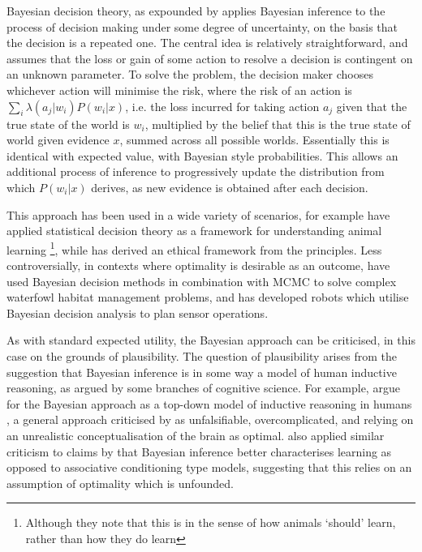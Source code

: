 Bayesian decision theory, as expounded by \citet{Robbins1964} applies
Bayesian inference to the process of decision making under some degree
of uncertainty, on the basis that the decision is a repeated one.
The central idea is relatively straightforward, and assumes that the
loss or gain of some action to resolve a decision is contingent on
an unknown parameter. To solve the problem, the decision maker chooses
whichever action will minimise the risk, where the risk of an action
is $\underset{i}{\sum}\lambda(a_{j}|w_{i})P(w_{i}|x)$, i.e. the loss
incurred for taking action $a_{j}$ given that the true state of the
world is $w_{i}$, multiplied by the belief that this is the true
state of world given evidence $x$, summed across all possible worlds.
Essentially this is identical with expected value, with Bayesian style
probabilities. This allows an additional process of inference to progressively
update the distribution from which $P(w_{i}|x)$ derives, as new evidence
is obtained after each decision. 

This approach has been used in a wide variety of scenarios, for example
\citet{McNamara1980} have applied statistical decision theory as
a framework for understanding animal learning%
\footnote{Although they note that this is in the sense of how animals `should'
learn, rather than how they do learn%
}, while \citet{Harsanyi1978} has derived an ethical framework from
the principles. Less controversially, in contexts where optimality
is desirable as an outcome, \citet{Survey2003} have used Bayesian
decision methods in combination with \ac{MCMC} to solve complex waterfowl
habitat management problems, and \citet{Kristensen1997} has developed
robots which utilise Bayesian decision analysis to plan sensor operations.

As with standard expected utility, the Bayesian approach can be criticised,
in this case on the grounds of plausibility. The question of plausibility
arises from the suggestion that Bayesian inference is in some way
a model of human inductive reasoning, as argued by some branches of
cognitive science. For example, \citeauthor{Tenenbaum2006} argue
for the Bayesian approach as a top-down model of inductive reasoning
in humans \citep{Tenenbaum2006,Griffiths2010}, a general approach
criticised by \citet{Bowers2012} as unfalsifiable, overcomplicated,
and relying on an unrealistic conceptualisation of the brain as optimal.
\citet{Miller2012} also applied similar criticism to claims by \citet{Gallistel2012}
that Bayesian inference better characterises learning as opposed to
associative conditioning type models, suggesting that this relies
on an assumption of optimality which is unfounded.


